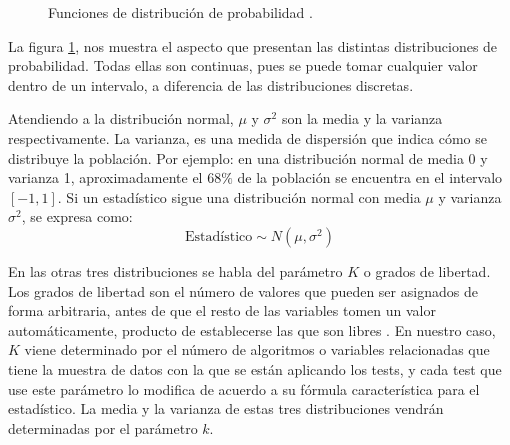 \begin{figure}[h]
\centering
{}
\caption{Funciones de distribución de probabilidad \cite{distribuciones_continuas}.}
\label{fig:pdf}
\end{figure}
La figura \ref{fig:pdf}, nos muestra el aspecto que presentan las distintas distribuciones de probabilidad. Todas ellas
son continuas, pues se puede tomar cualquier valor dentro de un intervalo, a diferencia de las distribuciones discretas.

Atendiendo a la distribución normal, $\mu$ y $\sigma^2$ son la media y la varianza respectivamente. La varianza, es una
medida de dispersión que indica cómo se distribuye la población. Por ejemplo: en una distribución normal de media 0 y
varianza 1, aproximadamente el $68\%$ de la población se encuentra en el intervalo $[-1,1]$. Si un estadístico sigue
una distribución normal con media $\mu$ y varianza $\sigma^2$, se expresa como:
\[ \mbox{Estadístico} \sim N(\mu,\sigma^2) \]

En las otras tres distribuciones se habla del parámetro $K$ o grados de libertad. Los grados de libertad son el
número de valores que pueden ser asignados de forma arbitraria, antes de que el resto de las variables tomen un
valor automáticamente, producto de establecerse las que son libres \cite{grados_libertad}. En nuestro caso, $K$ viene
determinado por el número de algoritmos o variables relacionadas que tiene la muestra de datos con la que se están
aplicando los tests, y cada test que use este parámetro lo modifica de acuerdo a su fórmula característica para el
estadístico. La media y la varianza de estas tres distribuciones vendrán determinadas por el parámetro $k$.


